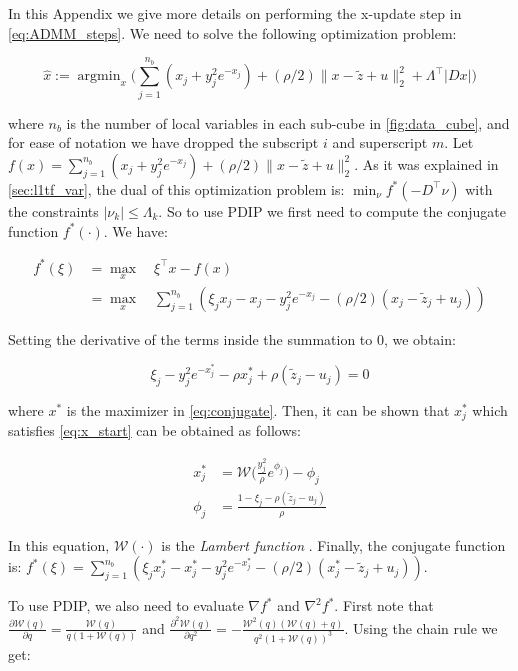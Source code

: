 \documentclass{article}
\DeclareMathOperator*{\argmin}{argmin}
\begin{document}
In this Appendix we give more details on performing the x-update step in \autoref{eq:ADMM_steps}. We need to solve the following optimization problem:

\begin{equation}
\hat{x}:=\argmin_{x} \bigg( \sum_{j=1}^{n_b} (x_j + y_j^2e^{-x_j}) + (\rho/2) \lVert x-\tilde{z} + u \lVert_2^2 + \Lambda^\top |D x| \bigg)
\label{eq:x_update_opt}
\end{equation}

\noindent where $n_b$ is the number of local variables in each sub-cube in \autoref{fig:data_cube}, and for ease of notation we have dropped the subscript $i$ and superscript $m$. Let $f(x)=\sum_{j=1}^{n_b} (x_j + y_j^2e^{-x_j}) + (\rho/2) \lVert x-\tilde{z} + u \lVert_2^2$. As it was explained in \autoref{sec:l1tf_var}, the dual of this optimization problem is: $\min_\nu f^*(-D^\top\nu)$ with the constraints $|\nu_k| \le \Lambda_k$. So to use PDIP we first need to compute the conjugate function $f^*(\cdot)$. We have:


\begin{align}
f^*(\xi) & = \max_x \quad \xi^\top x - f(x)\\
& =  \max_x \quad \sum_{j=1}^{n_b} (\xi_jx_j - x_j - y_j^2e^{-x_j} - (\rho/2)(x_j-\tilde{z}_j+u_j))
\label{eq:conjugate}
\end{align}

Setting the derivative of the terms inside the summation to 0, we obtain:

\begin{equation}
\xi_j-y_j^2e^{-x_j^*}-\rho x_j^* + \rho (\tilde{z}_j-u_j)=0
\label{eq:x_start}
\end{equation}

\noindent where $x^*$ is the maximizer in \ref{eq:conjugate}. Then, it can be shown that $x_j^*$ which satisfies \eqref{eq:x_start} can be obtained as follows:

\begin{align}
x^*_j & = \mathscr{W}\bigg(\frac{y_j^2}{\rho} e^{\phi_j} \bigg) - \phi_j \\
\phi_j & =\frac{1-\xi_j-\rho(\tilde{z}_j-u_j)}{\rho}
\end{align}

In this equation, $\mathscr{W}(\cdot)$ is the \textit{Lambert function} \cite{corless_lambertw_1996}. Finally, the conjugate function is: $f^*(\xi) = \sum_{j=1}^{n_b} (\xi_jx^*_j - x^*_j - y_j^2e^{-x^*_j} - (\rho/2)(x^*_j-\tilde{z}_j+u_j))$.

To use PDIP, we also need to evaluate $\nabla f^*$ and $\nabla^2 f^*$. First note that $\frac{\partial \mathscr{W}(q)}{\partial q} = \frac{\mathscr{W}(q)}{q(1+\mathscr{W}(q))}$ and $\frac{\partial^2 \mathscr{W}(q)}{\partial q^2} = - \frac{\mathscr{W}^2(q)(\mathscr{W}(q)+q)}{q^2(1+\mathscr{W}(q))^3}$. Using the chain rule we get:
\end{document}
